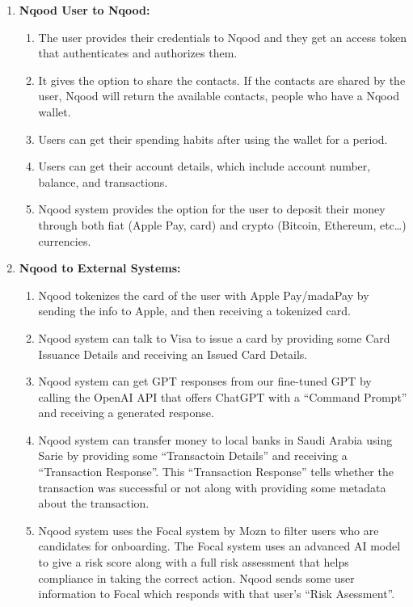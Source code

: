 \documentclass[a4paper]{report}
\begin{document}
\begin{enumerate}
    \item \textbf{Nqood User to Nqood:}
          \begin{enumerate}
              \item The user provides their credentials to Nqood and they get an access token that authenticates and authorizes them.
              \item It gives the option to share the contacts. If the contacts are shared by the user, Nqood will return the available contacts, people who have a Nqood wallet.
              \item Users can get their spending habits after using the wallet for a period.
              \item Users can get their account details, which include account number, balance, and transactions.
              \item Nqood system provides the option for the user to deposit their money through both fiat (Apple Pay, card) and crypto (Bitcoin, Ethereum, etc…) currencies.
          \end{enumerate}
    \item \textbf{Nqood to External Systems:}
          \begin{enumerate}
              \item Nqood tokenizes the card of the user with Apple Pay/madaPay by sending the info to Apple, and then receiving a tokenized card.
              \item Nqood system can talk to Visa to issue a card by providing some Card Issuance Details and receiving an Issued Card Details.
              \item Nqood system can get GPT responses from our fine-tuned GPT by calling the OpenAI API that offers ChatGPT with a “Command Prompt” and receiving a generated response.
              \item Nqood system can transfer money to local banks in Saudi Arabia using Sarie by providing some “Transactoin Details” and receiving a “Transaction Response”. This “Transaction Response” tells whether the transaction was successful or not along with providing some metadata about the transaction.
              \item Nqood system uses the Focal system by Mozn to filter users who are candidates for onboarding. The Focal system uses an advanced AI model to give a risk score along with a full risk assessment that helps compliance in taking the correct action. Nqood sends some user information to Focal which responds with that user’s “Risk Asessment”.

\end{enumerate}
\end{enumerate}
\end{document}
